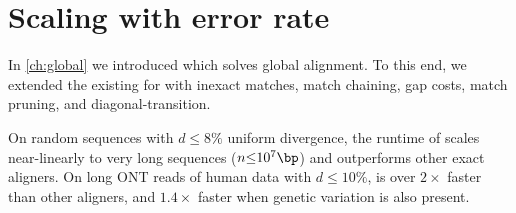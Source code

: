 \section{Scaling with error rate}

In \cref{ch:global} we introduced \astarpa which solves global alignment. To
this end, we extended the existing \sh for \A with inexact matches, match
chaining, gap costs, match pruning, and diagonal-transition.

On random sequences with $d{\leq}8\%$ uniform divergence, the runtime of
\astarpa scales near-linearly to very long sequences ($n{\leq}10^7\bp$) and
outperforms other exact aligners. On long ONT reads of human data with $d{\leq}10\%$,
\astarpa is over $2\times$ faster than other aligners, and $1.4\times$ faster
when genetic variation is also present.
